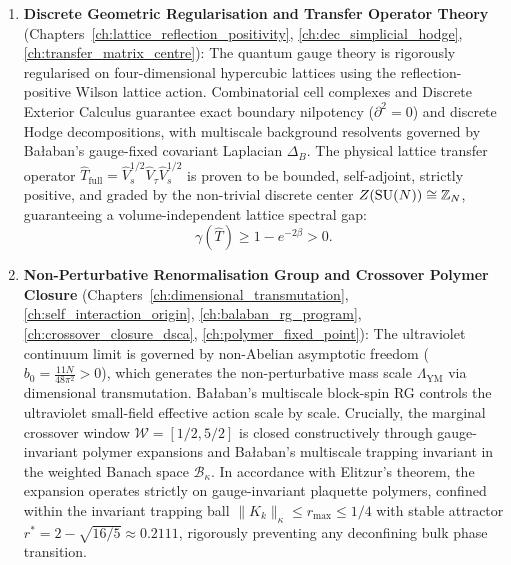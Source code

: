\begin{enumerate}[label=\textbf{Pillar \Roman*:}, leftmargin=*]
    \item \textbf{Discrete Geometric Regularisation and Transfer Operator Theory} (Chapters~\ref{ch:lattice_reflection_positivity}, \ref{ch:dec_simplicial_hodge}, \ref{ch:transfer_matrix_centre}): 
    The quantum gauge theory is rigorously regularised on four-dimensional hypercubic lattices using the reflection-positive Wilson lattice action. Combinatorial cell complexes and Discrete Exterior Calculus guarantee exact boundary nilpotency ($\partial^2 = 0$) and discrete Hodge decompositions, with multiscale background resolvents governed by Ba\l aban's gauge-fixed covariant Laplacian $\Delta_B$. The physical lattice transfer operator $\hat{T}_{\mathrm{full}} = \hat{V}_s^{1/2} \hat{V}_\tau \hat{V}_s^{1/2}$ is proven to be bounded, self-adjoint, strictly positive, and graded by the non-trivial discrete center $Z(\mathrm{SU}(N)) \cong \mathbb{Z}_N$, guaranteeing a volume-independent lattice spectral gap:
    \begin{equation}
    \gamma(\hat{T}) \ge 1 - e^{-2\beta} > 0.
    \end{equation}

    \item \textbf{Non-Perturbative Renormalisation Group and Crossover Polymer Closure} (Chapters~\ref{ch:dimensional_transmutation}, \ref{ch:self_interaction_origin}, \ref{ch:balaban_rg_program}, \ref{ch:crossover_closure_dsca}, \ref{ch:polymer_fixed_point}):
    The ultraviolet continuum limit is governed by non-Abelian asymptotic freedom ($b_0 = \frac{11N}{48\pi^2} > 0$), which generates the non-perturbative mass scale $\Lambda_{\mathrm{YM}}$ via dimensional transmutation. Ba{\l}aban's multiscale block-spin RG controls the ultraviolet small-field effective action scale by scale. Crucially, the marginal crossover window $\mathcal{W} = [1/2, 5/2]$ is closed constructively through gauge-invariant polymer expansions and Ba\l aban's multiscale trapping invariant in the weighted Banach space $\mathcal{B}_\kappa$. In accordance with Elitzur's theorem, the expansion operates strictly on gauge-invariant plaquette polymers, confined within the invariant trapping ball $\|K_k\|_\kappa \le r_{\max} \le 1/4$ with stable attractor $r^* = 2 - \sqrt{16/5} \approx 0.2111$, rigorously preventing any deconfining bulk phase transition.


\end{enumerate}
